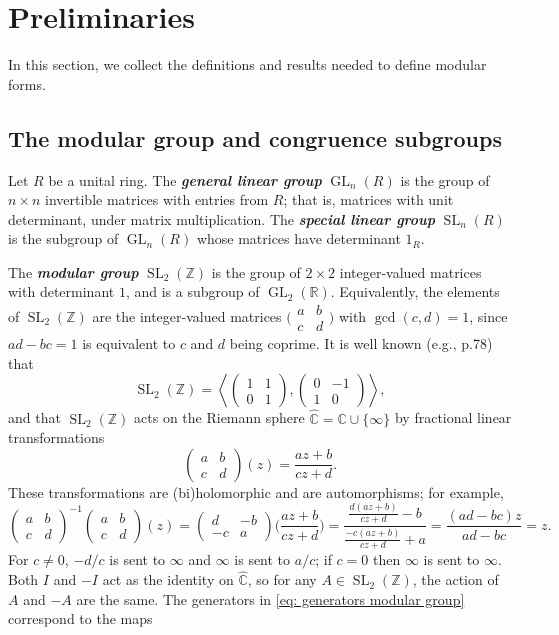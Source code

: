 \documentclass[10pt,leqno]{article}
\theoremstyle{plain}
\theoremstyle{definition}
\numberwithin{equation}{section}
\numberwithin{lem}{section}
\newcommand{\textib}[1]{\textbf{\textit{#1}}}
\DeclareMathOperator{\GL}{GL}
\DeclareMathOperator{\SL}{SL}
\begin{document}
\newpage\section{Preliminaries} In this section, we collect the definitions and results needed to define modular forms.
\subsection{The modular group and congruence subgroups}
Let $R$ be a unital ring. The \textib{general linear group} $\GL_n(R)$ is the group of $n\times n$ invertible matrices with entries from $R$; that is, matrices with unit determinant, under matrix multiplication. The \textib{special linear group} $\SL_n(R)$ is the subgroup of $\GL_n(R)$ whose matrices have determinant $1_R$.

The \textib{modular group} $\SL_2(\mathbb{Z})$ is the group of $2\times 2$ integer-valued matrices with determinant $1$, and is a subgroup of $\GL_2(\mathbb{R})$. Equivalently, the elements of $\SL_2(\mathbb{Z})$ are the integer-valued matrices $\big(\!\begin{smallmatrix}
    a & b \\ c & d
\end{smallmatrix}\!\big)$ with $\gcd(c,d) = 1$, since $ad-bc = 1$ is equivalent to $c$ and $d$ being coprime. It is well known (e.g., \cite{serre} p.78) that 
\begin{equation}\label{eq: generators modular group}
    \SL_2(\mathbb{Z}) = \left\langle\begin{pmatrix}
        1 & 1 \\ 0 & 1
    \end{pmatrix}, \begin{pmatrix}
        0 & -1 \\ 1 & 0
    \end{pmatrix}\right\rangle, 
\end{equation}
and that $\SL_2(\mathbb{Z})$ acts on the Riemann sphere $\widehat{\mathbb{C}} = \mathbb{C}\cup \{\infty\}$ by fractional linear transformations
\[\begin{pmatrix}
    a & b \\ c & d
\end{pmatrix}(z) = \frac{az + b}{cz + d}.\] These transformations are (bi)holomorphic and are automorphisms; for example, \[\begin{pmatrix}
    a & b \\ c & d
\end{pmatrix}^{-1}\begin{pmatrix}
    a & b \\ c & d
\end{pmatrix}(z) = \begin{pmatrix}
    d & -b \\ -c & a
\end{pmatrix}\Big(\frac{az+b}{cz+d}\Big) = \frac{\frac{d(az+b)}{cz+d}- b}{\frac{-c(az+b)}{cz+d}+a} = \frac{(ad-bc)z}{ad-bc} = z.\] For $c\neq 0$, $-d/c$ is sent to $\infty$ and $\infty$ is sent to $a/c$; if $c = 0$ then $\infty$ is sent to $\infty$. Both $I$ and $-I$ act as the identity on $\widehat{\mathbb{C}}$, so for any $A\in \SL_2(\mathbb{Z})$, the action of $A$ and $-A$ are the same. The generators in \cref{eq: generators modular group} correspond to the maps
\end{document}
